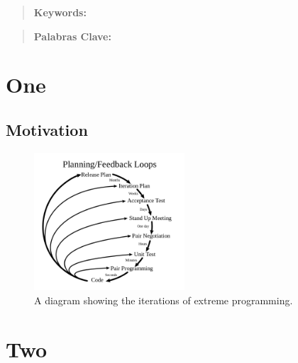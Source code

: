 \documentclass[12pt, a4paper, twoside]{article}
\begin{document}


\newpage





\begin{abstract}
    \blindtext[2]

	\bfseries{\large{Keywords:}}
\end{abstract}

\newpage

\begin{abstract}
    \blindtext[2]

	\bfseries{\large{Palabras Clave:}}
\end{abstract}

\tableofcontents

\section{One \\}

\subsection{Motivation}
    \blindtext[2]
    
    \begin{figure}[ht]
      \centering
        \includegraphics[width=0.5\textwidth]{xp}
      \caption{A diagram showing the iterations of extreme programming.}
    \end{figure}
    
    \blindtext[4]

\section{Two \\}
    \blindmathpaper
\end{document}

